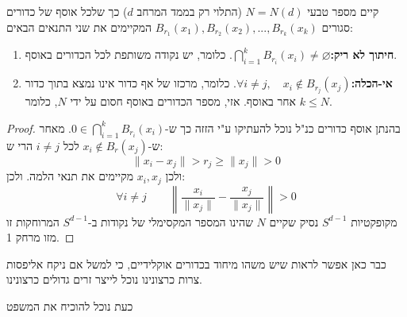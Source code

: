 \documentclass{tstextbook}
\begin{document}
\begin{proposition}
קיים מספר טבעי \(N = N(d)\) (התלוי רק בממד המרחב \(d\)) כך שלכל אוסף של כדורים סגורים \(B_{r_1}(x_1), B_{r_2}(x_2), ..., B_{r_k}(x_k)\) המקיימים את שני התנאים הבאים:

  \begin{enumerate}
    \item \textbf{חיתוך לא ריק:}\(\bigcap_{i=1}^{k} B_{r_i}(x_i) \neq \varnothing\). כלומר, יש נקודה משותפת לכל הכדורים באוסף. 


    \item \textbf{אי-הכלה:}\(\forall i \neq j, \quad x_i \notin B_{r_j}(x_j)\). כלומר, מרכזו של אף כדור אינו נמצא בתוך כדור אחר באוסף. 
אזי, מספר הכדורים באוסף חסום על ידי \(N\), כלומר \(k \leq N\).


  \end{enumerate}
\end{proposition}
\begin{proof}
בהנתן אוסף כדורים כנ"ל נוכל להעתיקו ע"י הזזה כך ש-\(0 \in \bigcap_{i=1}^{k} B_{r_{i}}(x_{i})\).
מאחר ש-\(x_{i}\not \in B_{r}(x_{j})\) לכל \(i \neq j\) הרי ש:
$$\lVert x_{i}-x_{j} \rVert > r_{j}\geq \lVert x_{j} \rVert > 0$$
ולכן \(x_{i},x_{j}\) מקיימים את תנאי הלמה. ולכן:
$$\forall i\neq j\qquad \left\lVert  \frac{x_{i}}{\lVert x_{j} \rVert }-\frac{x_{j}}{\lVert x_{j} \rVert }  \right\rVert > 0$$
מקופקטיות \(S^{d-1}\) נסיק שקיים \(N\) שהינו המספר המקסימלי של נקודות ב-\(S^{d-1}\) המרוחקות זו מזו מרחק 1.

\end{proof}
\begin{remark}
כבר כאן אפשר לראות שיש משהו מיחוד בכדורים אוקלידיים, כי למשל אם ניקח אליפסות צרות כרצונינו נוכל לייצר זרים גדולים כרצונינו.

\end{remark}
כעת נוכל להוכיח את המשפט
\end{document}
